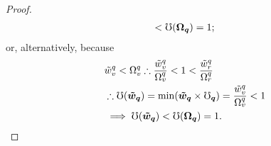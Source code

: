 \documentclass[hidelinks, nonatbib]{elsarticle}
\begin{document}
\begin{lemma}
\begin{proof}
\begin{align}
            <
            \mho(\boldsymbol{\Omega_q})
            =
            1
            ;
        \end{align}
        or, alternatively, because
        \begin{align}
            &
            \tilde{w}_{v}^{q} < \Omega_{v}^{q}
            \therefore
            \frac{
                \tilde{w}_{v}^{q}
            }{
                \Omega_{v}^{q}
            }
            < 
            1
            < 
            \frac{
                \tilde{w}_{r}^{q}
            }{
                \Omega_{r}^{q}
            }
            \\
            &\therefore
            \mho(\boldsymbol{\tilde{w}_q})
            = 
            \min(
                \boldsymbol{\tilde{w}_q}
                \times
                \boldsymbol{\mho_q}
            )
            =
            \frac{
                \tilde{w}_{v}^{q}
            }{
                \Omega_{v}^{q}
            }
            < 
            1
            \\
            &
            \implies
            \mho(\boldsymbol{\tilde{w}_q})
            <
            \mho(\boldsymbol{\Omega_q})
            =
            1
            .
        \end{align}
        

\end{proof}
\end{lemma}
\end{document}
